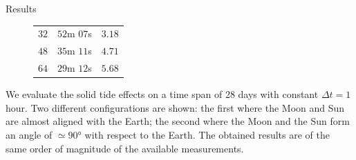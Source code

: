 \documentclass[final]{beamer}
\newlength{\onecolwid}
\begin{document}
\begin{frame}[t]
\begin{columns}[t]
\begin{column}{\onecolwid}
\begin{block}{Results}
\begin{figure}
\begin{center}
\begin{tabular}{ccc}
      $32$ & \hspace{0.5em}$52$m $07$s & $3.18$\\
      $48$ & \hspace{0.5em}$35$m $11$s & $4.71$\\
      $64$ & \hspace{0.5em}$29$m $12$s & $5.68$\\
      \bottomrule
    \end{tabular}
  \end{center}
\end{figure}
\vspace*{.2em}

We evaluate the solid tide effects on a time span of 28 days with constant
$\Delta t = 1$ hour. Two different configurations are shown: the first where
the Moon and Sun are almost aligned with the Earth; the second where the Moon
and the Sun form an angle of $\simeq90\text{°}$ with respect to the Earth. The
obtained results are of the same order of magnitude of the available
measurements.


\end{block}
\end{column}
\end{columns}
\end{frame}
\end{document}
